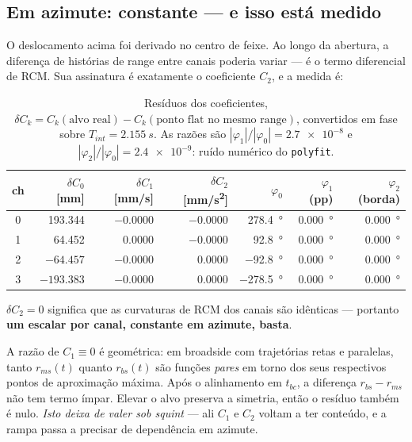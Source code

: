 \documentclass[11pt,a4paper]{article}
\begin{document}
\subsection{Em azimute: constante --- e isso está medido}

O deslocamento acima foi derivado no centro de feixe. Ao longo da abertura,
a diferença de histórias de range entre canais poderia variar --- é o termo
diferencial de RCM. Sua assinatura é exatamente o coeficiente $C_2$, e a
medida é:

\begin{table}[h]
\centering
\begin{tabular}{crrrrrr}
\toprule
ch & $\delta C_0$ [mm] & $\delta C_1$ [mm/s] & $\delta C_2$ [mm/s\textsuperscript{2}]
   & $\varphi_0$ & $\varphi_1$ (pp) & $\varphi_2$ (borda) \\
\midrule
0 & \num{193.344} & $-\num{0.0000}$ & $-\num{0.0000}$ & \SI{278.4}{\degree} & \SI{0.000}{\degree} & \SI{0.000}{\degree} \\
1 & \num{64.452}  & \num{0.0000}    & $-\num{0.0000}$ & \SI{92.8}{\degree}  & \SI{0.000}{\degree} & \SI{0.000}{\degree} \\
2 & $-\num{64.457}$ & $-\num{0.0000}$ & \num{0.0000}  & \SI{-92.8}{\degree} & \SI{0.000}{\degree} & \SI{0.000}{\degree} \\
3 & $-\num{193.383}$ & $-\num{0.0000}$ & \num{0.0000} & \SI{-278.5}{\degree} & \SI{0.000}{\degree} & \SI{0.000}{\degree} \\
\bottomrule
\end{tabular}
\caption{Resíduos dos coeficientes,
$\delta C_k = C_k(\text{alvo real}) - C_k(\text{ponto flat no mesmo range})$,
convertidos em fase sobre $T_{int}=\SI{2.155}{s}$. As razões são
$|\varphi_1|/|\varphi_0| = \num{2.7e-8}$ e
$|\varphi_2|/|\varphi_0| = \num{2.4e-9}$: ruído numérico do \texttt{polyfit}.}
\label{tab:coef}
\end{table}

\noindent
$\delta C_2 = 0$ significa que as curvaturas de RCM dos canais são idênticas
--- portanto \textbf{um escalar por canal, constante em azimute, basta}.

A razão de $C_1 \equiv 0$ é geométrica: em broadside com trajetórias retas e
paralelas, tanto $r_{ms}(t)$ quanto $r_{bs}(t)$ são funções \emph{pares} em
torno dos seus respectivos pontos de aproximação máxima. Após o alinhamento
em $t_{bc}$, a diferença $r_{bs}-r_{ms}$ não tem termo ímpar. Elevar o alvo
preserva a simetria, então o resíduo também é nulo. \emph{Isto deixa de valer
sob squint} --- ali $C_1$ e $C_2$ voltam a ter conteúdo, e a rampa passa a
precisar de dependência em azimute.
\end{document}
